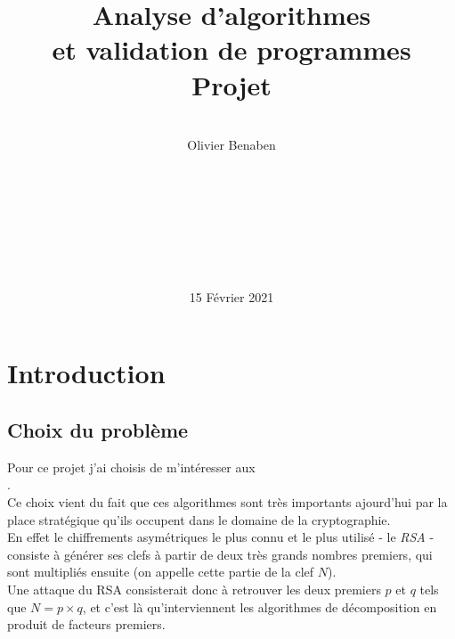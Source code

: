 \title{
\hline \vspace{.3cm}
{\Huge Analyse d’algorithmes \\et validation de programmes
\vspace{.3cm} \hline \vspace{1cm}
{\large\linebreak\\}}{\Large Projet
\\\linebreak\linebreak}
\linebreak{\Huge[ISTY]}
}
\author{\\Olivier Benaben\\
\\\\
\\
\\\\
\\
\\
}
\date{15 Février 2021}
\maketitle
\newpage



\section{Introduction}\label{Introduction}%
    \subsection{Choix du problème}
    
        Pour ce projet j'ai choisis de m'intéresser aux 
        \\.\\
        
        Ce choix vient du fait que ces algorithmes sont très importants ajourd'hui par la place stratégique qu'ils occupent dans le domaine de la cryptographie.\\
        En effet le chiffrements asymétriques le plus connu et le plus utilisé - le \textit{RSA} - consiste à générer ses clefs à partir de deux très grands nombres premiers, qui sont multipliés ensuite (on appelle cette partie de la clef $N$).\\
        Une attaque du RSA consisterait donc à retrouver les deux premiers $p$ et $q$ tels que $N = p \times q$, et c'est là qu'interviennent les algorithmes de décomposition en produit  de facteurs premiers.\\
        
